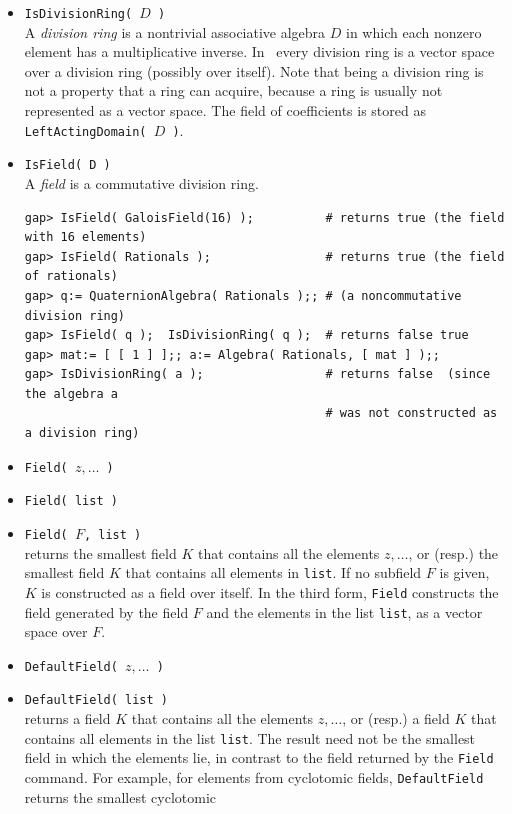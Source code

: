\begin{itemize}
\item {\tt IsDivisionRing( $D$ )}\\
A \emph{division ring} is a nontrivial associative algebra $D$ in which each nonzero
element has a multiplicative inverse. 
In \gap\ every division ring is a vector space over a division ring (possibly over
itself). Note that being a division ring is not a property that a ring can acquire,
because a ring is usually not represented as a vector space. 
The field of coefficients is stored as {\tt LeftActingDomain( $D$ )}.

\item {\tt IsField( D )}\\
A \emph{field} is a commutative division ring.
{\codesize
\begin{verbatim}
gap> IsField( GaloisField(16) );          # returns true (the field with 16 elements)
gap> IsField( Rationals );                # returns true (the field of rationals)
gap> q:= QuaternionAlgebra( Rationals );; # (a noncommutative division ring)
gap> IsField( q );  IsDivisionRing( q );  # returns false true
gap> mat:= [ [ 1 ] ];; a:= Algebra( Rationals, [ mat ] );;
gap> IsDivisionRing( a );                 # returns false  (since the algebra a
                                          # was not constructed as a division ring)
\end{verbatim}}
\item {\tt Field( $z,\dots$ )}
\item {\tt Field( list )}
\item {\tt Field( $F$, list )}\\
returns the smallest field $K$ that contains all the elements $z,\dots$, or (resp.) the
smallest field $K$ that contains all elements in {\tt list}. 
If no subfield $F$ is given, $K$ is constructed as a field over itself. In the third form, {\tt Field} constructs the field generated
by the field $F$ and the elements in the list {\tt list}, as a vector space over $F$.
\item {\tt DefaultField( $z,\dots$ )}
\item {\tt DefaultField( list )}\\
returns a field $K$ that contains all the elements $z, \dots$, or (resp.) a field $K$ that contains all elements
in the list {\tt list}.  The result need not be the smallest field in which the elements lie, 
in contrast to the field returned by the {\tt Field} command. For example, for
elements from cyclotomic fields, {\tt DefaultField} returns the smallest cyclotomic

\end{itemize}
